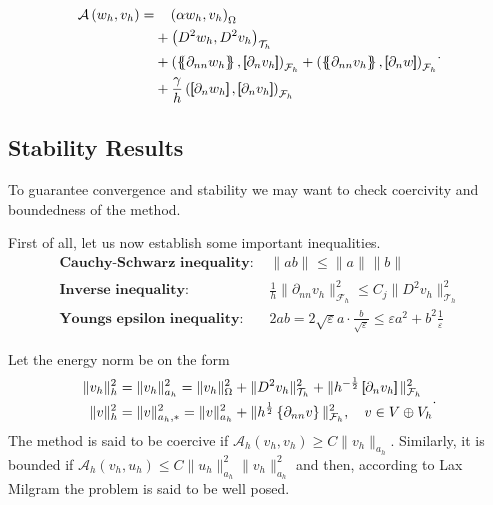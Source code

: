 \begin{equation}
\label{eq:CP_A_h}
\begin{split}
\mathcal{A} \left( w_{h}, v_{h} \right)   =&
  \quad  \left( \alpha  w_{h}, v_{h} \right) _{\Omega }\\
&  +  \left( D^2 w_{h}, D^2v_{h} \right) _{\mathcal{T} _{h}} \\
 & +
  \left( \mean{  \partial _{n n} w_{h} }, \jump{ \partial _{n }v_{h}} \right)_{\mathcal{F}_{h}}  +
 \left( \mean{ \partial _{n n} v_{h} }, \jump{ \partial _{n}w }      \right)_{\mathcal{F}_{h}}
 \\
 & + \frac{\gamma }{h}  \left( \jump{ \partial _{n} w_{h}}, \jump{ \partial _{n} v_{h}   }   \right)_{\mathcal{F}_{h}} \\
\end{split}
.
\end{equation}

\subsection{ Stability Results}%
\label{sub:error_and_stability_analysis_of_c0ip}

To guarantee convergence and stability we may want to check coercivity and boundedness of the method.

First of all, let us now establish some important inequalities.
\[
\begin{split}
    \textbf{Cauchy-Schwarz inequality: } & \| ab \|_{  }^{  }  \le \| a \|_{  }^{  } \| b \|_{  }^{  }   \\
    \textbf{Inverse inequality: } & \frac{1}{h}\| \partial _{nn}  v_{h} \|_{\mathcal{F}_{h}   }^{2  }  \le C_{j} \| D ^2 v_{h} \|_{ \mathcal{T} _{h} }^{ 2 }   \\
    \textbf{Youngs epsilon inequality: } & 2ab =   2\sqrt{\varepsilon }a\cdot    \frac{b}{\sqrt{\varepsilon } } \le \varepsilon a^2+ b^2 \frac{1}{\varepsilon }
\end{split}
\]

Let the energy norm be on the form
\begin{equation}
\label{eq:A_energy_norm}
    \begin{split}
\| v_{h} \|_{ h }^{2  } & = \| v_{h} \|_{ a_{h} }^{ 2 } =  \| v_{h} \|_{ \Omega  }^{2  }  +  \| D ^2 v_{h} \|_{ \mathcal{T} _{h}  }^{ 2 }  + \|  h^{-\frac{1}{2}} \left[\!\!\left[  \partial _{n} v_{h}     \right]\!\!\right]\|_{  \mathcal{F} _{h} }^{2  } \\
\| v \|_{ h }^{ 2 }  &= \| v \|_{ a_{h},* }^{ 2 } = \| v \|_{ a_{h} }^{ 2 }  + \| h^{\frac{1}{2}} \left\{ \partial _{nn } v\right\}  \|_{ \mathcal{F}_{h}   }^{  2}, \quad  v\in V \oplus V_{h}
    \end{split}
.\end{equation}
The method is said to be coercive if $\mathcal{A} _{h}\left( v_{h}, v_{h} \right) \ge  C \| v_{h} \|_{ a_{h} }^{  } $. Similarly, it is bounded if $ \mathcal{A} _{h} \left( v_{h}, u_{h} \right) \le  C \| u_{h} \|_{  a_{h}}^{ 2 }  \| v_{h} \|_{ a_{h}
}^{ 2 } $ and then, according to Lax Milgram the problem is said to be well posed.

